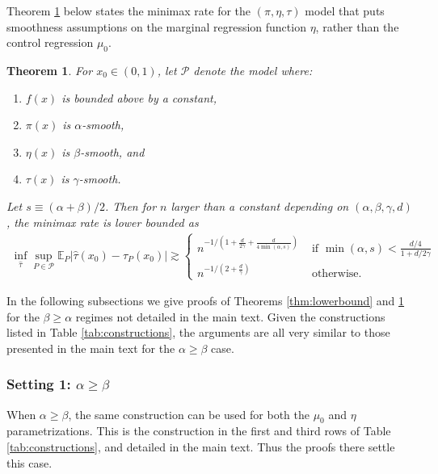 \documentclass[11pt,twoside]{article}
\newcommand{\E}{\mathbb{E}}
\newtheorem{theorem}{Theorem}
\theoremstyle{definition}
\theoremstyle{remark}
\begin{document}
Theorem \ref{thm:lowerbound2} below states the minimax rate for the $(\pi,\eta,\tau)$ model that puts smoothness assumptions on the marginal regression function $\eta$, rather than the control regression $\mu_0$. \\

\begin{theorem} \label{thm:lowerbound2}
For $x_0 \in (0,1)$, let $\mathcal{P}$ denote the model where:
\begin{enumerate}
\item $f(x)$ is bounded above by a constant,
\item $\pi(x)$ is $\alpha$-smooth, %
\item $\eta(x)$ is $\beta$-smooth, and
\item $\tau(x)$ is $\gamma$-smooth.
\end{enumerate}
Let $s \equiv (\alpha+\beta)/2$. 
Then for $n$ larger than a constant depending on $(\alpha,\beta,\gamma,d)$, the minimax rate is lower bounded as
\begin{align*}
\inf_{\widehat\tau} \sup_{P \in \mathcal{P}} \E_P | \widehat\tau(x_0) - \tau_P(x_0)| \gtrsim \begin{cases}
n^{-1/\left(1 + \frac{d}{2\gamma} + \frac{d}{4 \min(\alpha,s)} \right) } & \text{ if } \min(\alpha,s) < \frac{d/4}{1+d/2\gamma}  \\
n^{-1/\left(2 + \frac{d}{\gamma}  \right) } & \text{ otherwise}  . 
\end{cases}
\end{align*}
\end{theorem}

\bigskip

 In the following subsections we give proofs of Theorems \ref{thm:lowerbound} and \ref{thm:lowerbound2} for the $\beta \geq \alpha$ regimes not detailed in the main text. Given the constructions listed in Table \ref{tab:constructions}, the arguments are all very similar to those presented in the main text for the $\alpha \geq \beta$ case. \\

\subsubsection{Setting 1: $\alpha \geq \beta$}

When $\alpha \geq \beta$, the same construction can be used for both the $\mu_0$ and $\eta$ parametrizations. This is the construction in the first and third rows of Table \ref{tab:constructions}, and detailed in the main text. Thus the proofs there settle this case. \\
\end{document}
